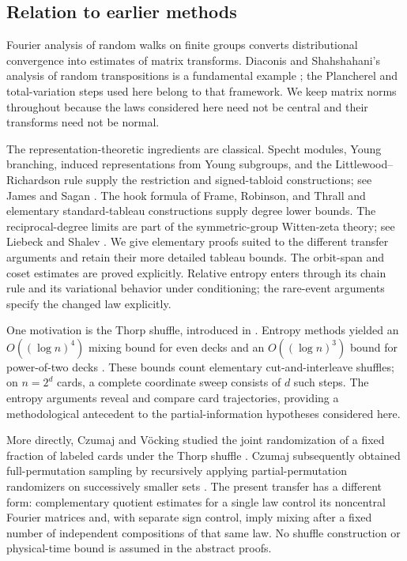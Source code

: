\subsection{Relation to earlier methods}

Fourier analysis of random walks on finite groups converts distributional convergence into estimates of matrix transforms. Diaconis and Shahshahani's analysis of random transpositions is a fundamental example \cite{diaconis-shahshahani}; the Plancherel and total-variation steps used here belong to that framework. We keep matrix norms throughout because the laws considered here need not be central and their transforms need not be normal.

The representation-theoretic ingredients are classical. Specht modules, Young branching, induced representations from Young subgroups, and the Littlewood--Richardson rule supply the restriction and signed-tabloid constructions; see James \cite{James1978} and Sagan \cite{sagan}. The hook formula of Frame, Robinson, and Thrall \cite{frame-robinson-thrall} and elementary standard-tableau constructions supply degree lower bounds. The reciprocal-degree limits are part of the symmetric-group Witten-zeta theory; see Liebeck and Shalev \cite[Proposition~2.5 and Theorem~2.6]{liebeck-shalev2004}. We give elementary proofs suited to the different transfer arguments and retain their more detailed tableau bounds. The orbit-span and coset estimates are proved explicitly. Relative entropy enters through its chain rule and its variational behavior under conditioning; the rare-event arguments specify the changed law explicitly.

One motivation is the Thorp shuffle, introduced in \cite{Thorp1973}.
Entropy methods yielded an $O((\log n)^4)$ mixing bound for even decks
and an $O((\log n)^3)$ bound for power-of-two decks
\cite{Morris2009,Morris2013}. These bounds count elementary
cut-and-interleave shuffles; on $n=2^d$ cards, a complete coordinate
sweep consists of $d$ such steps. The entropy arguments reveal and
compare card trajectories, providing a methodological antecedent to
the partial-information hypotheses considered here.

More directly, Czumaj and V\"ocking studied the joint randomization
of a fixed fraction of labeled cards under the Thorp shuffle
\cite{CzumajVocking2014}. Czumaj subsequently obtained full-permutation
sampling by recursively applying partial-permutation randomizers on
successively smaller sets \cite{Czumaj2015}. The present transfer has
a different form: complementary quotient estimates for a single law
control its noncentral Fourier matrices and, with separate sign
control, imply mixing after a fixed number of independent compositions
of that same law. No shuffle construction or physical-time bound is
assumed in the abstract proofs.

